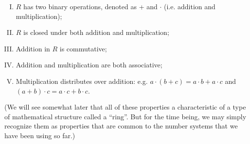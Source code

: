 \begin{enumerate}[(I)]
\item $R$ has two binary operations, denoted as + and $\cdot$ (i.e. addition and multiplication);
\item $R$ is closed under both addition and multiplication;
\item Addition in $R$ is commutative;
\item Addition and multiplication are both associative;
\item Multiplication distributes over addition: e.g. $a \cdot (b+c) = a\cdot b + a\cdot c$ and $(a+b) \cdot c = a \cdot c + b \cdot c$. 
\end{enumerate}
(We will see somewhat later that all of these properties a characteristic of a type of mathematical structure called a ``ring''.  But for the time being, we may simply recognize them as properties that are common to the number systems that we have been using so far.)




